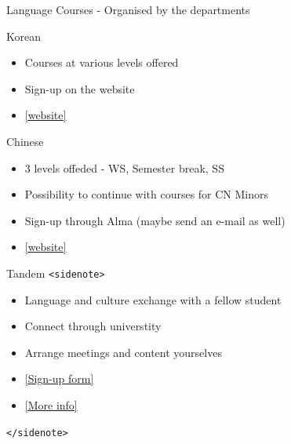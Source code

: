 \documentclass[aspectratio=169,hyperref={unicode}]{beamer}
\begin{document}
\begin{frame}{Language Courses - Organised by the departments}

\begin{block}{Korean}
\begin{itemize}
	\item Courses at various levels offered
	\item Sign-up on the website
	\item \href{https://uni-tuebingen.de/en/fakultaeten/philosophische-fakultaet/fachbereiche/asien-orient-wissenschaften/koreanistik/sejong-institute/anmeldung-einstufung/}{[website]}
\end{itemize}

\end{block}	

\begin{block}{Chinese}
\begin{itemize}
\item 3 levels offeded - WS, Semester break, SS
\item Possibility to continue with courses for CN Minors
\item Sign-up through Alma (maybe send an e-mail as well)
\item \href{https://uni-tuebingen.de/fakultaeten/philosophische-fakultaet/fachbereiche/asien-orient-wissenschaften/sinologie/studium/lehrveranstaltungen/chinesisch-fuer-nicht-sinologinnen/}{[website]}
\end{itemize}
\end{block}
\end{frame}

\begin{frame}{Tandem}
\texttt{<sidenote>}
\begin{itemize}
	\item Language and culture exchange with a fellow student
	\item Connect through universtity
	\item Arrange meetings and content yourselves
	\item \href{https://forms.office.com/pages/responsepage.aspx?id=M1hH4ejb4EqJTs0PVhyY9Bpz0WnynVBNpDHH1Lt3mzxUMVdCSFFLVDFETUZBTjg0MDFZRTJZWkZVVSQlQCN0PWcu&route=shorturl}{[Sign-up form]}
	\item \href{https://uni-tuebingen.de/en/international/learning-languages/international-in-tuebingen/tandem-learning/}{[More info]}
\end{itemize}
\texttt{</sidenote>}	
\end{frame}
\end{document}

